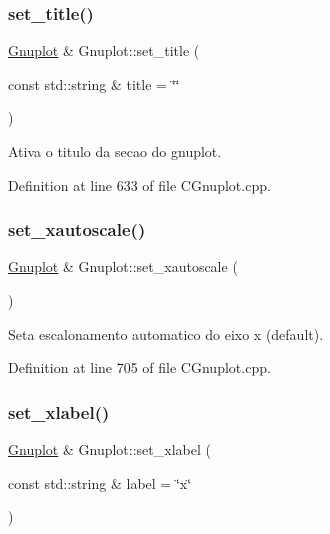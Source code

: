 \subsubsection{\texorpdfstring{set\+\_\+title()}{set\_title()}}
{\footnotesize\ttfamily \hyperlink{class_gnuplot}{Gnuplot} \& Gnuplot\+::set\+\_\+title (\begin{DoxyParamCaption}\item[{const std\+::string \&}]{title = {\ttfamily \char`\"{}\char`\"{}} }\end{DoxyParamCaption})}



Ativa o titulo da secao do gnuplot. 



Definition at line 633 of file C\+Gnuplot.\+cpp.

\mbox{\label{class_gnuplot_a453688dc2eb979f842082290f3c02ac3}} 
\subsubsection{\texorpdfstring{set\+\_\+xautoscale()}{set\_xautoscale()}}
{\footnotesize\ttfamily \hyperlink{class_gnuplot}{Gnuplot} \& Gnuplot\+::set\+\_\+xautoscale (\begin{DoxyParamCaption}{ }\end{DoxyParamCaption})}



Seta escalonamento automatico do eixo x (default). 



Definition at line 705 of file C\+Gnuplot.\+cpp.

\mbox{\label{class_gnuplot_a58808028aec03a22b5c19693b14baeef}} 
\subsubsection{\texorpdfstring{set\+\_\+xlabel()}{set\_xlabel()}}
{\footnotesize\ttfamily \hyperlink{class_gnuplot}{Gnuplot} \& Gnuplot\+::set\+\_\+xlabel (\begin{DoxyParamCaption}\item[{const std\+::string \&}]{label = {\ttfamily \char`\"{}x\char`\"{}} }\end{DoxyParamCaption})}



